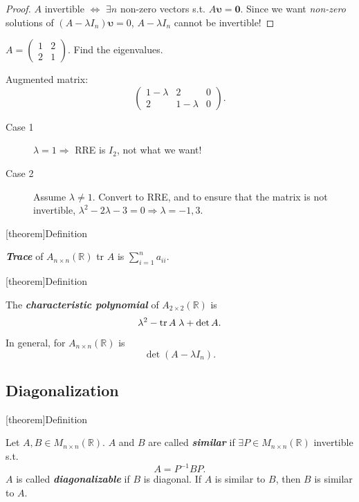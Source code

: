 \documentclass[12pt]{report}
\theoremstyle{definition}
\begin{document}
\begin{proof}
    $A$ invertible $\iff$ $\exists n$ non-zero vectors s.t. $A\pmb{\upsilon} = \pmb{0}$.
    Since we want \emph{non-zero} solutions of $(A - \lambda I_n)\pmb{\upsilon} = 0$,
    $A - \lambda I_n$ cannot be invertible!
\end{proof}

\begin{ex}
    $A = \begin{pmatrix}
        1 & 2\\
        2 & 1
    \end{pmatrix}$. Find the eigenvalues.

    Augmented matrix:\[
        \begin{pmatrix}
            1 - \lambda & 2 & 0 \\
            2 & 1 - \lambda & 0
        \end{pmatrix}.
    \]
    \begin{description}
        \item[Case 1] $\lambda = 1 \Rightarrow{}$ RRE is $I_2$, not what we want!
        \item[Case 2] Assume $\lambda \neq 1$. Convert to RRE,
            and to ensure that the matrix is not invertible,
            $\lambda^{2} - 2\lambda - 3 = 0 \Rightarrow{} \lambda = -1, 3$.
    \end{description}
\end{ex}

[theorem]{Definition}
\begin{trace of A}
    \textbf{\emph{Trace}} of $A_{n\times n}(\mathbb{R})$ tr $A$ is $\sum_{i=1}^{n} a_{ii}$.
\end{trace of A}

[theorem]{Definition}
\begin{characteristic polynomial}
    The \textbf{\emph{characteristic polynomial}} of $A_{2\times 2}(\mathbb{R})$ is\[
        \lambda^{2} - \textnormal{tr}\,A\;\lambda + \det{A}.
    \]In general, for $A_{n\times n}(\mathbb{R})$ is\[
    \det{(A - \lambda I_n)}.
    \]
\end{characteristic polynomial}

\subsection{Diagonalization}

[theorem]{Definition}
\begin{diagonalization}
    Let $A,B \in M_{n\times n}(\mathbb{R})$. $A$ and $B$ are called \textbf{\emph{similar}} if
    $\exists P \in M_{n\times n}(\mathbb{R})$ invertible s.t.\[
        A = P^{-1}BP.
    \]
    $A$ is called \textbf{\emph{diagonalizable}} if $B$ is diagonal.
    If $A$ is similar to $B$, then $B$ is similar to $A$.
\end{diagonalization}
\end{document}
